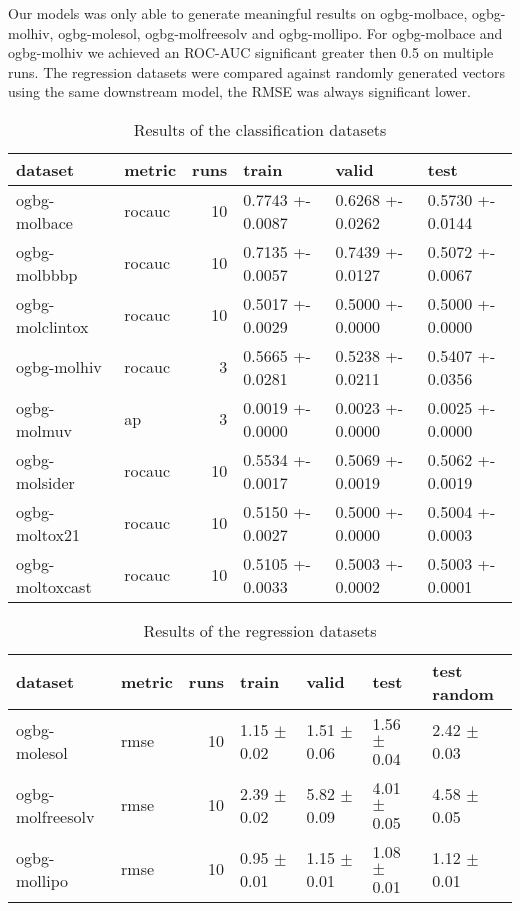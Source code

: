 Our models was only able to generate meaningful results on ogbg-molbace, ogbg-molhiv, ogbg-molesol, ogbg-molfreesolv and ogbg-mollipo. For ogbg-molbace and ogbg-molhiv we achieved an ROC-AUC significant greater then 0.5 on multiple runs. The regression datasets were compared against randomly generated vectors using the same downstream model, the RMSE was always significant lower.

\begin{table}[h]
    \centering
    \begin{tabular}{llrlll}
        \toprule
        dataset         & metric & runs & train            & valid            & test             \\
        \midrule
        ogbg-molbace    & rocauc & 10   & 0.7743 +- 0.0087 & 0.6268 +- 0.0262 & 0.5730 +- 0.0144 \\
        ogbg-molbbbp    & rocauc & 10   & 0.7135 +- 0.0057 & 0.7439 +- 0.0127 & 0.5072 +- 0.0067 \\
        ogbg-molclintox & rocauc & 10   & 0.5017 +- 0.0029 & 0.5000 +- 0.0000 & 0.5000 +- 0.0000 \\
        ogbg-molhiv     & rocauc & 3    & 0.5665 +- 0.0281 & 0.5238 +- 0.0211 & 0.5407 +- 0.0356 \\
        ogbg-molmuv     & ap     & 3    & 0.0019 +- 0.0000 & 0.0023 +- 0.0000 & 0.0025 +- 0.0000 \\
        ogbg-molsider   & rocauc & 10   & 0.5534 +- 0.0017 & 0.5069 +- 0.0019 & 0.5062 +- 0.0019 \\
        ogbg-moltox21   & rocauc & 10   & 0.5150 +- 0.0027 & 0.5000 +- 0.0000 & 0.5004 +- 0.0003 \\
        ogbg-moltoxcast & rocauc & 10   & 0.5105 +- 0.0033 & 0.5003 +- 0.0002 & 0.5003 +- 0.0001 \\
        \bottomrule
    \end{tabular}

    \caption{Results of the classification datasets}
    \label{table:ogbg-classification_results}
\end{table}

\begin{table}[h]
    \centering
    \begin{tabular}{llrllll}
        \toprule
        dataset          & metric & runs & train           & valid           & test            & test random     \\
        \midrule
        ogbg-molesol     & rmse   & 10   & 1.15 $\pm$ 0.02 & 1.51 $\pm$ 0.06 & 1.56 $\pm$ 0.04 & 2.42 $\pm$ 0.03 \\
        ogbg-molfreesolv & rmse   & 10   & 2.39 $\pm$ 0.02 & 5.82 $\pm$ 0.09 & 4.01 $\pm$ 0.05 & 4.58 $\pm$ 0.05 \\
        ogbg-mollipo     & rmse   & 10   & 0.95 $\pm$ 0.01 & 1.15 $\pm$ 0.01 & 1.08 $\pm$ 0.01 & 1.12 $\pm$ 0.01 \\
        \bottomrule
    \end{tabular}
    \caption{Results of the regression datasets}
    \label{table:ogbg-regression_results}
\end{table}


